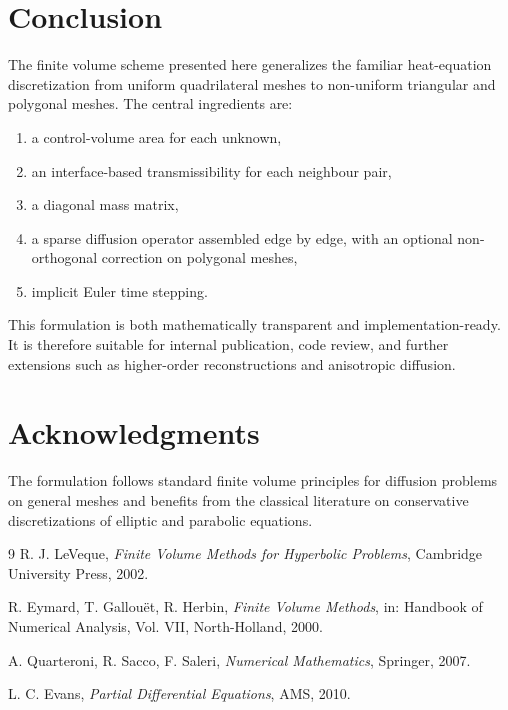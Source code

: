\documentclass[11pt]{article}
\theoremstyle{plain}
\theoremstyle{definition}
\theoremstyle{remark}
\numberwithin{equation}{section}
\begin{document}
\section{Conclusion}
The finite volume scheme presented here generalizes the familiar heat-equation discretization from uniform quadrilateral meshes to non-uniform triangular and polygonal meshes. The central ingredients are:
\begin{enumerate}[label=\arabic*.]
\item a control-volume area for each unknown,
\item an interface-based transmissibility for each neighbour pair,
\item a diagonal mass matrix,
\item a sparse diffusion operator assembled edge by edge, with an optional non-orthogonal correction on polygonal meshes,
\item implicit Euler time stepping.
\end{enumerate}

This formulation is both mathematically transparent and implementation-ready. It is therefore suitable for internal publication, code review, and further extensions such as higher-order reconstructions and anisotropic diffusion.

\section*{Acknowledgments}
The formulation follows standard finite volume principles for diffusion problems on general meshes and benefits from the classical literature on conservative discretizations of elliptic and parabolic equations.

\begin{thebibliography}{9}
R. J. LeVeque, \emph{Finite Volume Methods for Hyperbolic Problems}, Cambridge University Press, 2002.

R. Eymard, T. Gallou\"et, R. Herbin, \emph{Finite Volume Methods}, in: Handbook of Numerical Analysis, Vol. VII, North-Holland, 2000.

A. Quarteroni, R. Sacco, F. Saleri, \emph{Numerical Mathematics}, Springer, 2007.

L. C. Evans, \emph{Partial Differential Equations}, AMS, 2010.
\end{thebibliography}
\end{document}
